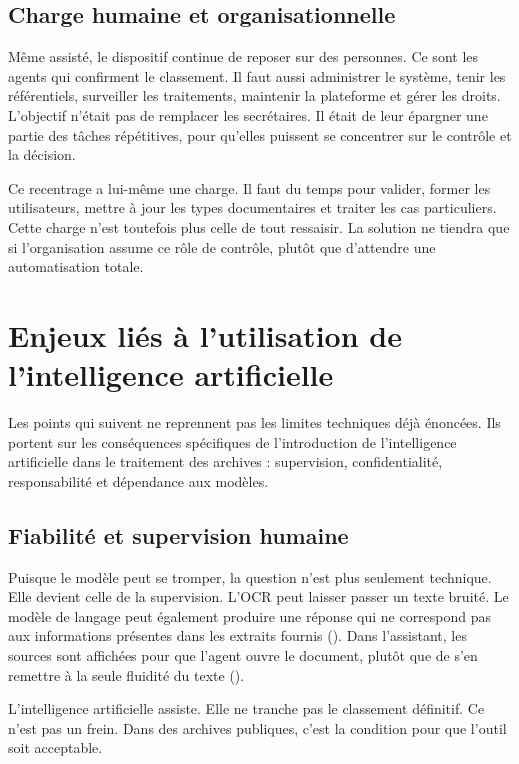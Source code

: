\subsection{Charge humaine et organisationnelle}

Même assisté, le dispositif continue de reposer sur des personnes. Ce sont les agents qui confirment le classement. Il faut aussi administrer le système, tenir les référentiels, surveiller les traitements, maintenir la plateforme et gérer les droits. L'objectif n'était pas de remplacer les secrétaires. Il était de leur épargner une partie des tâches répétitives, pour qu'elles puissent se concentrer sur le contrôle et la décision.

Ce recentrage a lui-même une charge. Il faut du temps pour valider, former les utilisateurs, mettre à jour les types documentaires et traiter les cas particuliers. Cette charge n'est toutefois plus celle de tout ressaisir. La solution ne tiendra que si l'organisation assume ce rôle de contrôle, plutôt que d'attendre une automatisation totale.

\section{Enjeux liés à l'utilisation de l'intelligence artificielle}

Les points qui suivent ne reprennent pas les limites techniques déjà énoncées. Ils portent sur les conséquences spécifiques de l'introduction de l'intelligence artificielle dans le traitement des archives : supervision, confidentialité, responsabilité et dépendance aux modèles.

\subsection{Fiabilité et supervision humaine}

Puisque le modèle peut se tromper, la question n'est plus seulement technique. Elle devient celle de la supervision. L'OCR peut laisser passer un texte bruité. Le modèle de langage peut également produire une réponse qui ne correspond pas aux informations présentes dans les extraits fournis (). Dans l'assistant, les sources sont affichées pour que l'agent ouvre le document, plutôt que de s'en remettre à la seule fluidité du texte ().

L'intelligence artificielle assiste. Elle ne tranche pas le classement définitif. Ce n'est pas un frein. Dans des archives publiques, c'est la condition pour que l'outil soit acceptable.

